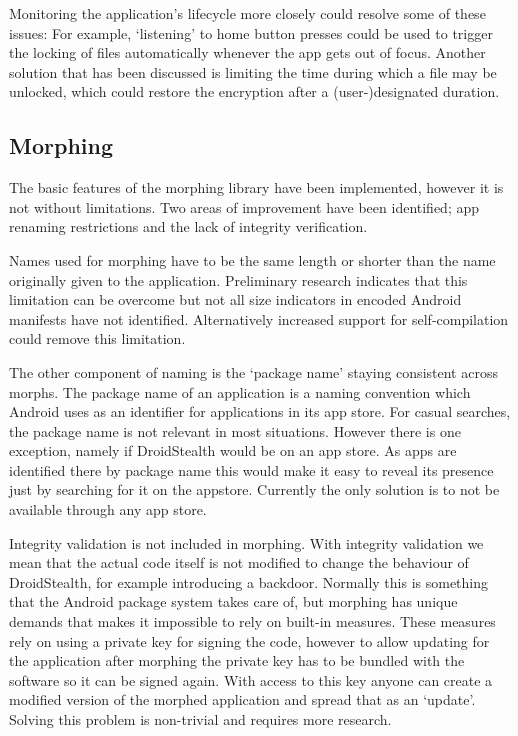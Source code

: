 Monitoring the application's lifecycle more closely could resolve some of these issues:
For example, `listening' to home button presses could be used to trigger the locking of files automatically whenever the app gets out of focus.
Another solution that has been discussed is limiting the time during which a file may be unlocked, which could restore the encryption after a (user-)designated duration.

\subsection{Morphing} 
\label{sec:limitations:morphing}

The basic features of the morphing library have been implemented, however it is not without limitations.
Two areas of improvement have been identified; app renaming restrictions and the lack of integrity verification.

Names used for morphing have to be the same length or shorter than the name originally given to the application.
Preliminary research indicates that this limitation can be overcome but not all size indicators in encoded Android manifests have not identified.
Alternatively increased support for self-compilation could remove this limitation.

The other component of naming is the `package name' staying consistent across morphs. 
The package name of an application is a naming convention which Android uses as an identifier for applications in its app store.
For casual searches, the package name is not relevant in most situations.
However there is one exception, namely if DroidStealth would be on an app store. 
As apps are identified there by package name this would make it easy to reveal its presence just by searching for it on the appstore.
Currently the only solution is to not be available through any app store.

Integrity validation is not included in morphing.
With integrity validation we mean that the actual code itself is not modified to change the behaviour of DroidStealth, for example introducing a backdoor.
Normally this is something that the Android package system takes care of, but morphing has unique demands that makes it impossible to rely on built-in measures.
These measures rely on using a private key for signing the code, however to allow updating for the application after morphing the private key has to be bundled with the software so it can be signed again.
With access to this key anyone can create a modified version of the morphed application and spread that as an `update'.
Solving this problem is non-trivial and requires more research.

